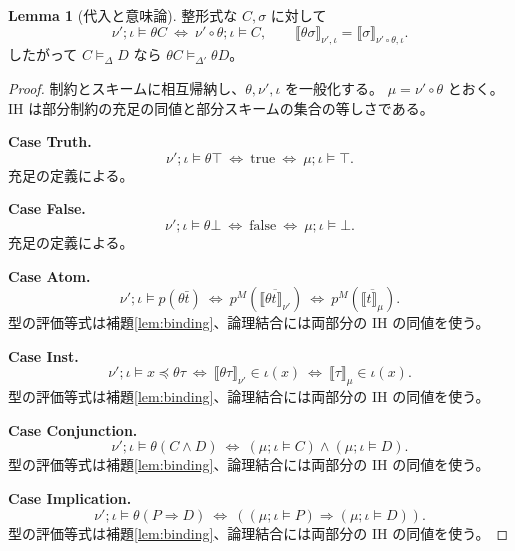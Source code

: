 \documentclass[a4paper,11pt]{article}
\theoremstyle{definition}
\newtheorem{lemma}[definition]{Lemma}
\newenvironment{Case}[1]{\par\smallskip\noindent\textbf{Case #1.}\enspace\ignorespaces}{\par}
\newcommand{\ent}[2]{#1\models_{\Delta}#2}
\newcommand{\den}[1]{\llbracket #1\rrbracket}
\newcommand{\inst}[2]{#1\preccurlyeq #2}
\newcommand{\proofspace}{\Needspace{16\baselineskip}}
\begin{document}
\proofspace
\begin{samepage}
\begin{lemma}[代入と意味論]\label{lem:semantic-subst}
整形式な $C,\sigma$ に対して
\[
 \nu';\iota\models\theta C\ \Longleftrightarrow\
 \nu'\circ\theta;\iota\models C,
 \qquad
 \den{\theta\sigma}_{\nu',\iota}=\den\sigma_{\nu'\circ\theta,\iota}.
\]
したがって $\ent C D$ なら $\theta C\models_{\Delta'}\theta D$。
\end{lemma}
\end{samepage}
\nopagebreak[4]
\begin{proof}\leavevmode\label{proof:lem:semantic-subst}
制約とスキームに相互帰納し、$\theta,\nu',\iota$ を一般化する。
$\mu=\nu'\circ\theta$ とおく。IH は部分制約の充足の同値と部分スキームの集合の等しさである。

\begin{Case}{Truth}
\[
\nu';\iota\models\theta\top\ \Longleftrightarrow\ \mathrm{true}\ \Longleftrightarrow\ \mu;\iota\models\top.\]
充足の定義による。
\end{Case}

\begin{Case}{False}
\[
\nu';\iota\models\theta\bot\ \Longleftrightarrow\ \mathrm{false}\ \Longleftrightarrow\ \mu;\iota\models\bot.\]
充足の定義による。
\end{Case}

\begin{Case}{Atom}
\[
\nu';\iota\models p(\theta\bar t)\ \Longleftrightarrow\ p^M(\overline{\den{\theta t}_{\nu'}})\ \Longleftrightarrow\ p^M(\overline{\den t_\mu}).\]
型の評価等式は補題\ref{lem:binding}、論理結合には両部分の IH の同値を使う。
\end{Case}

\begin{Case}{Inst}
\[
\nu';\iota\models\inst x{\theta\tau}\ \Longleftrightarrow\ \den{\theta\tau}_{\nu'}\in\iota(x)\ \Longleftrightarrow\ \den\tau_\mu\in\iota(x).\]
型の評価等式は補題\ref{lem:binding}、論理結合には両部分の IH の同値を使う。
\end{Case}

\begin{Case}{Conjunction}
\[
\nu';\iota\models\theta(C\land D)\ \Longleftrightarrow\ (\mu;\iota\models C)\land(\mu;\iota\models D).\]
型の評価等式は補題\ref{lem:binding}、論理結合には両部分の IH の同値を使う。
\end{Case}

\begin{Case}{Implication}
\[
\nu';\iota\models\theta(P\Rightarrow D)\ \Longleftrightarrow\ ((\mu;\iota\models P)\Rightarrow(\mu;\iota\models D)).\]
型の評価等式は補題\ref{lem:binding}、論理結合には両部分の IH の同値を使う。
\end{Case}


\end{proof}
\end{document}
